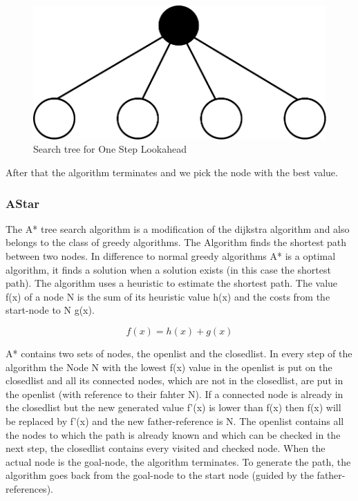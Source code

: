\begin{figure}
\centering
\includegraphics[scale=0.3]{images/onestep_lookahead.pdf}
\caption{Search tree for One Step Lookahead}
\label{fig:onestep}
\end{figure}


After that the algorithm terminates and we pick the node with the best value.

\subsubsection{AStar}

The A* tree search algorithm is a modification of the dijkstra algorithm and also belongs to the class of greedy algorithms. The Algorithm finds the shortest path between two nodes. In difference to normal greedy algorithms A* is a optimal algorithm, it finds a solution when a solution exists (in this case the shortest path). The algorithm uses a heuristic to estimate the shortest path. The value f(x) of a node N is the sum of its heuristic value h(x) and the costs from the start-node to N g(x).

\begin{equation}
f(x)=h(x)+g(x)
\end{equation}


A* contains two sets of nodes, the openlist and the closedlist. In every step of the algorithm the Node N with the lowest f(x) value in the openlist is put on the closedlist and all its connected nodes, which are not in the closedlist, are put in the openlist (with reference to their fahter N). If a connected node is already in the closedlist but the new generated value f'(x) is lower than f(x) then f(x) will be replaced by f'(x) and the new father-reference is N. The openlist contains all the nodes to which the path is already known and which can be checked in the next step, the closedlist contains every visited and checked node. When the actual node is the goal-node, the algorithm terminates. To generate the path, the algorithm goes back from the goal-node to the start node (guided by the father-references). 


